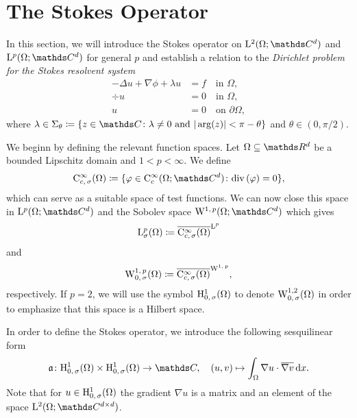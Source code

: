 \section{The Stokes Operator}
\label{sec:stokesOperator}

In this section, we will introduce the Stokes operator on $\Ell^2(\Omega; \C^d)$ and $\Ell^p(\Omega; \C^d)$ for general $p$ and establish a relation to the \emph{Dirichlet problem for the Stokes resolvent system}
\begin{align}
  -\Delta u + \nabla \phi + \lambda u &= f  \quad\text{in } \Omega, \nonumber\\
  \div u &= 0 \quad\text{in } \Omega, \label{eq:stokesResolventSystem} \\
  u &= 0 \quad\text{on } \partial\Omega, \nonumber
\end{align}
where $\lambda \in \Sigma_\theta \coloneqq \{ z \in \C \colon \lambda \neq 0 \text{ and } |\arg(z) | < \pi - \theta \}$ and $\theta \in (0, \pi/2)$.

We beginn by defining the relevant function spaces.
Let $\Omega \subseteq \R^d$ be a bounded Lipschitz domain and $1 < p < \infty$. 
We define
\begin{align*}
  \CC_{c,\, \sigma}^\infty(\Omega) \coloneqq \{ \varphi \in \CC_c^\infty(\Omega; \C^d) \colon \div(\varphi) = 0 \},
\end{align*}
which can serve as a suitable space of test functions.
We can now close this space in $\Ell^p(\Omega; \C^d)$ and the Sobolev space $\WW^{1,\,p}(\Omega; \C^d)$ which gives
\begin{align*}
  \mathrm{L}_\sigma^p(\Omega) \coloneqq \overline{\mathrm{C}_{c,\,\sigma}^\infty(\Omega)}^{\mathrm{L}^p}
\end{align*}
and
\begin{align*}
  \mathrm{W}_{0,\,\sigma}^{1,\,p}(\Omega) \coloneqq \overline{\mathrm{C}_{c,\,\sigma}^\infty(\Omega)}^{\mathrm{W}^{1,\,p}},
\end{align*}
respectively.
If $p = 2$, we will use the symbol $\mathrm{H}_{0,\,\sigma}^1(\Omega)$ to denote $\mathrm{W}_{0,\,\sigma}^{1,2}(\Omega)$ in order to emphasize that this space is a Hilbert space.

In order to define the Stokes operator, we introduce the following sesquilinear form
\begin{align*}
  \aform \colon \HH_{0,\,\sigma}^1(\Omega) \times \HH_{0,\,\sigma}^1(\Omega) \to \C, \quad (u,v) \mapsto \int_\Omega \nabla u \cdot \overline{\nabla v} \d x.
\end{align*}
Note that for $u \in \mathrm{H}_{0,\,\sigma}^1(\Omega)$ the gradient $\nabla u$ is a matrix and an element of the space $\Ell^2(\Omega; \C^{d \times d})$.

